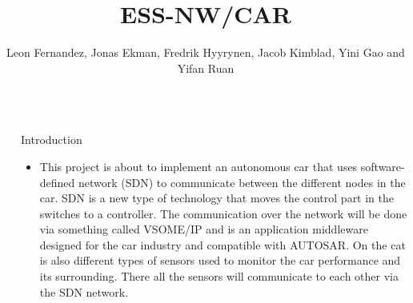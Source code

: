 \documentclass[final,hyperref={pdfpagelabels=false}]{beamer}
\title{\huge ESS-NW/CAR} %
\author{Leon Fernandez, Jonas Ekman, Fredrik Hyyrynen, Jacob Kimblad, Yini Gao and  Yifan Ruan} %
\institute{ MF2063 Embedded Systems Design Project} %
\begin{document}

\begin{frame}[t] %

\begin{columns}[t] %

\begin{column}{.02\textwidth}\end{column} %

\begin{column}{.465\textwidth} %


            
\begin{block}{Introduction}

\begin{itemize}
\item This project is about to implement an autonomous car that uses software-defined network (SDN) to communicate between the different nodes in the car. SDN is a new type of technology that moves the control part in the switches to a controller. The communication over the network will be done via something called VSOME/IP and is an application middleware designed for the car industry and compatible with AUTOSAR. On the cat is also different types of sensors used to monitor the car performance and its surrounding. There all the sensors will communicate to each other via the SDN network. 
\end{itemize}


\end{block}
\end{column}
\end{columns}
\end{frame}
\end{document}
